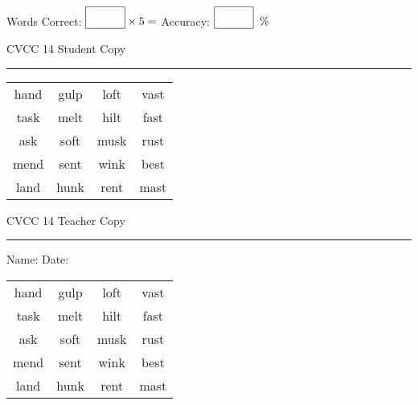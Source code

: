 \documentclass{memoir}
\begin{document}
\small

Words Correct: $\fbox{\phantom{\huge 100}} \times 5 = $ Accuracy: $\fbox{\phantom{\huge 100}}\;\; \%$ 

\vfill

\newpage


\footnotesize \noindent
CVCC 14 \hfill Student Copy
\smallskip
\hrule

\Large

\setlength{\tabcolsep}{14pt}
\def\arraystretch{3}

{\selectfont


\begin{vplace}[0.5]
\begin{center}
\begin{tabular}{cccc}
hand & gulp & loft & vast \\
task & melt & hilt & fast \\
ask  & soft & musk & rust \\
mend & sent & wink & best  \\
land & hunk & rent & mast \\
\end{tabular}
\end{center}
\end{vplace}

}

\newpage

\footnotesize \noindent
CVCC 14 \hfill Teacher Copy
\smallskip
\hrule

\small

\vfill

\noindent
Name: \underline{\hspace{1.75in}} \hfill Date: \underline{\hspace{1in}}

\Large

{\selectfont


\begin{vplace}[0.5]
\begin{center}
\begin{tabular}{cccc}
hand & gulp & loft & vast \\
task & melt & hilt & fast \\
ask  & soft & musk & rust \\
mend & sent & wink & best  \\
land & hunk & rent & mast \\
\end{tabular}
\end{center}
\end{vplace}



}
\end{document}
